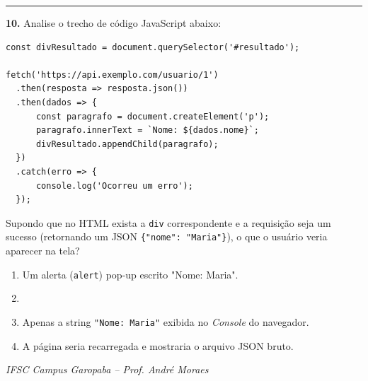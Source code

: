 \documentclass[12pt,a4paper]{article}
\newcommand{\correto}[1]{\iftoggle{gabarito}{\textcolor{corGabarito}{\textbf{#1}}}{#1}}
\begin{document}
\vspace{0.3cm}
\hrule
\vspace{0.3cm}
\textbf{10.} Analise o trecho de código JavaScript abaixo:

\begin{verbatim}
const divResultado = document.querySelector('#resultado');

fetch('https://api.exemplo.com/usuario/1')
  .then(resposta => resposta.json())
  .then(dados => {
      const paragrafo = document.createElement('p');
      paragrafo.innerText = `Nome: ${dados.nome}`;
      divResultado.appendChild(paragrafo);
  })
  .catch(erro => {
      console.log('Ocorreu um erro');
  });
\end{verbatim}

Supondo que no HTML exista a \texttt{div} correspondente e a requisição seja um sucesso (retornando um JSON \texttt{\{"nome": "Maria"\}}), o que o usuário veria aparecer na tela?
\begin{enumerate}[label=(\alph*)]
    \item Um alerta (\texttt{alert}) pop-up escrito "Nome: Maria".
    \item \correto{Um novo parágrafo na página contendo o texto "Nome: Maria".}
    \item Apenas a string \texttt{"Nome: Maria"} exibida no \textit{Console} do navegador.
    \item A página seria recarregada e mostraria o arquivo JSON bruto.
\end{enumerate}

\vfill
\begin{center}
    \footnotesize \textit{IFSC Campus Garopaba -- Prof. André Moraes}
\end{center}
\end{document}

